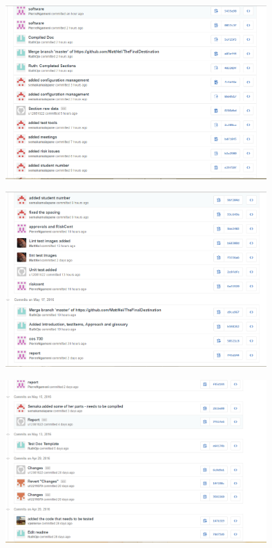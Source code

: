 \begin{figure}[H]
  		\centering
      	\includegraphics[width=100mm]{gitThree}	      	
  		\caption{}
\end{figure}

\begin{figure}[H]
  		\centering
      	\includegraphics[width=100mm]{gitTwo}	      	
  		\caption{}
\end{figure}

\begin{figure}[H]
  		\centering
      	\includegraphics[width=100mm]{gitOne}	      	
  		\caption{}
\end{figure}


